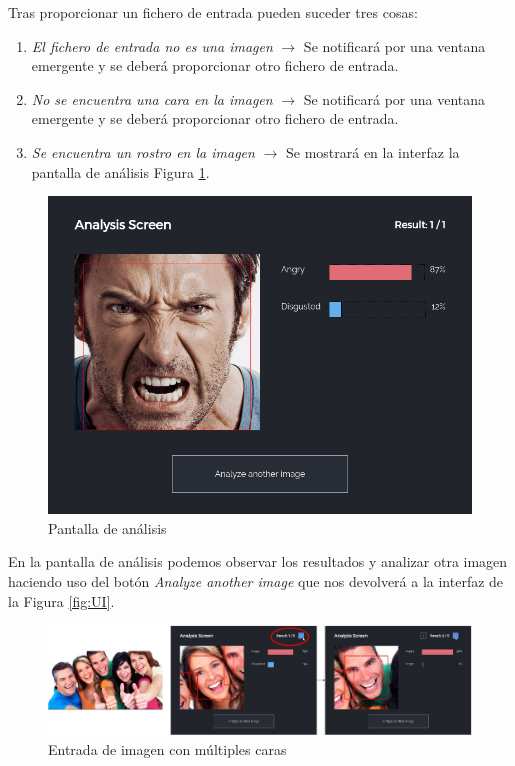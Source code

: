 \documentclass[a4paper,11pt]{book}
\begin{document}
Tras proporcionar un fichero de entrada pueden suceder tres cosas:\\
\begin{enumerate}
	\item \textit{El fichero de entrada no es una imagen} \(\rightarrow\) Se notificará por una ventana emergente y se deberá proporcionar otro fichero de entrada.
	\item \textit{No se encuentra una cara en la imagen} \(\rightarrow\) Se notificará por una ventana emergente y se deberá proporcionar otro fichero de entrada.
	\item \textit{Se encuentra un rostro en la imagen} \(\rightarrow\) Se mostrará en la interfaz la pantalla de análisis Figura \ref{fig:analysiscreen}.
\end{enumerate}
\begin{figure}[h]
\centering
\includegraphics[width=0.7\linewidth]{imagenes/analysiscreen}
\caption[Pantalla de análisis]{Pantalla de análisis}
\label{fig:analysiscreen}
\end{figure}

En la pantalla de análisis podemos observar los resultados y analizar otra imagen haciendo uso del botón \textit{Analyze another image} que nos devolverá a la interfaz de la Figura \ref{fig:UI}.

\begin{figure}[h]
	\centering
	\includegraphics[width=1.2\linewidth]{imagenes/multipleFaces01}
	\caption[Múltiples caras]{Entrada de imagen con múltiples caras}
	\label{fig:multipleFaces01}
\end{figure}
\end{document}
